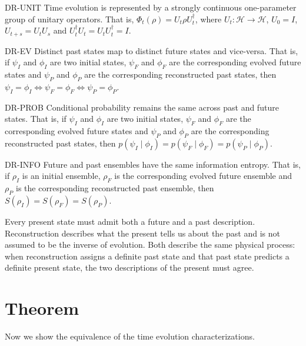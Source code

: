 \documentclass{techbrief}
\begin{document}
\begin{condition}{DR-UNIT}
	Time evolution is represented by a strongly continuous one-parameter group of unitary operators. That is, $\Phi_t(\rho)=U_t\rho U_t^\dagger$, where $U_t:\mathcal{H}\to\mathcal{H}$, $U_0=I$, $U_{t+s}=U_tU_s$ and $U_t^\dagger U_t=U_tU_t^\dagger=I$.
\end{condition}

\begin{condition}{DR-EV}
	Distinct past states map to distinct future states and vice-versa. That is, if $\psi_I$ and $\phi_I$ are two initial states, $\psi_F$ and $\phi_F$ are the corresponding evolved future states and $\psi_P$ and $\phi_P$ are the corresponding reconstructed past states, then $\psi_I = \phi_I \iff \psi_F = \phi_F \iff \psi_P = \phi_P$.
\end{condition}

\begin{condition}{DR-PROB}
	Conditional probability remains the same across past and future states. That is, if $\psi_I$ and $\phi_I$ are two initial states, $\psi_F$ and $\phi_F$ are the corresponding evolved future states and $\psi_P$ and $\phi_P$ are the corresponding reconstructed past states, then $p(\psi_I \mid \phi_I) = p(\psi_F \mid \phi_F) = p(\psi_P \mid \phi_P)$.
\end{condition}

\begin{condition}{DR-INFO}
	Future and past ensembles have the same information entropy. That is, if $\rho_I$ is an initial ensemble, $\rho_F$ is the corresponding evolved future ensemble and $\rho_P$ is the corresponding reconstructed past ensemble, then $S(\rho_I) = S(\rho_F) = S(\rho_P)$.
\end{condition}
Every present state must admit both a future and a past description. Reconstruction describes what the present tells us about the past and is not assumed to be the inverse of evolution. Both describe the same physical process: when reconstruction assigns a definite past state and that past state predicts a definite present state, the two descriptions of the present must agree.

\section{Theorem}

Now we show the equivalence of the time evolution characterizations.
\end{document}
